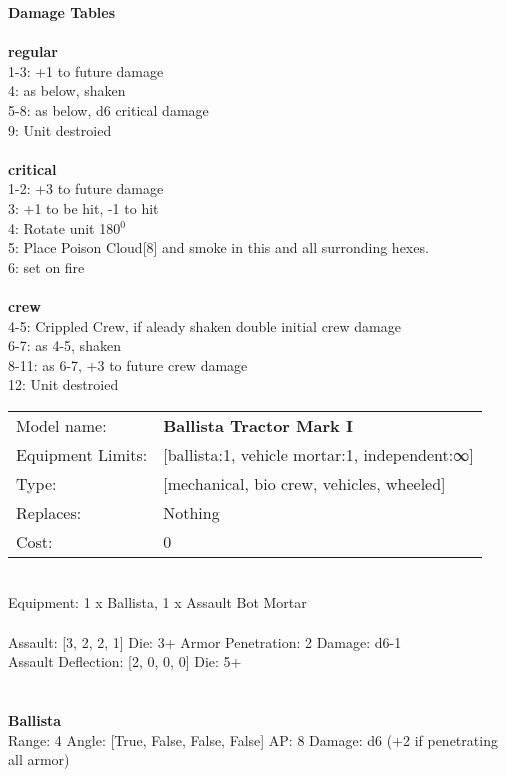 {\bf Damage Tables} \\
\ \\ {\bf regular } \\
1-3: +1 to future damage \\
4: as below, shaken \\
5-8: as below, d6 critical damage \\
9: Unit destroied \\
\ \\ {\bf critical } \\
1-2: +3 to future damage \\
3: +1 to be hit, -1 to hit \\
4: Rotate unit 180$^0$ \\
5: Place Poison Cloud[8] and smoke in this and all surronding hexes. \\
6: set on fire \\
\ \\ {\bf crew } \\
4-5: Crippled Crew, if aleady shaken double initial crew damage \\
6-7: as 4-5, shaken \\
8-11: as 6-7, +3 to future crew damage \\
12: Unit destroied \\


\noindent
\begin{tabular}{ll}
Model name: &{\bf Ballista Tractor Mark I } \\
Equipment Limits: &[ballista:1, vehicle mortar:1, independent:∞] \\
Type: &[mechanical, bio crew, vehicles, wheeled] \\
Replaces: &Nothing \\
Cost: & 0\\
\end{tabular}
\ \\
Equipment: 1 x Ballista, 1 x Assault Bot Mortar \\
\ \\
Assault: [3, 2, 2, 1] Die: 3+ Armor Penetration: 2 Damage: d6-1 \\
Assault Deflection: [2, 0, 0, 0] Die: 5+\\
\indent  
\ \\

\ \\
{\bf Ballista } \\



Range: 4  Angle: [True, False, False, False] AP: 8 Damage: d6 (+2 if penetrating all armor) \\




